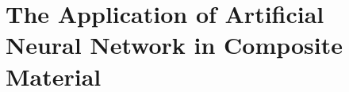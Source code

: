 
\chapter{The Application of Artificial Neural Network in Composite Material} %

\label{Chapter4} %




%





%

